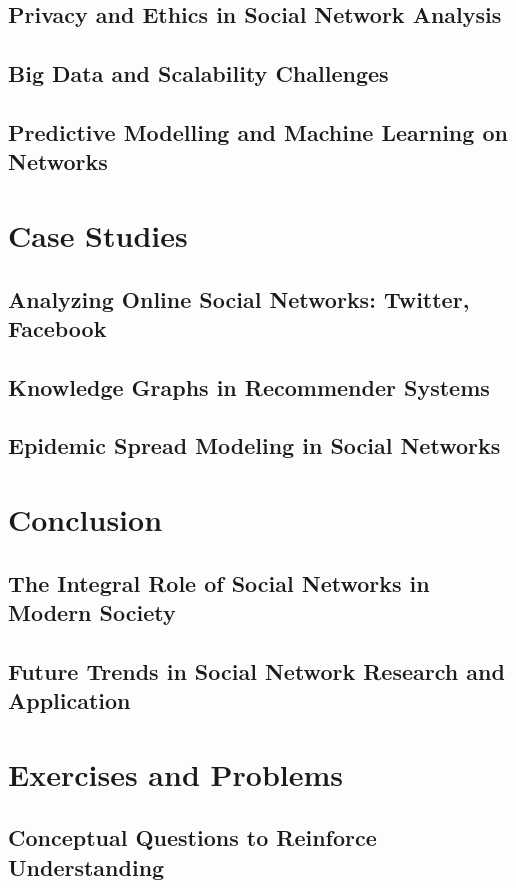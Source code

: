 \documentclass[12pt]{book} %
\begin{document}
\subsection{Privacy and Ethics in Social Network Analysis}
\subsection{Big Data and Scalability Challenges}
\subsection{Predictive Modelling and Machine Learning on Networks}

\section{Case Studies}
\subsection{Analyzing Online Social Networks: Twitter, Facebook}
\subsection{Knowledge Graphs in Recommender Systems}
\subsection{Epidemic Spread Modeling in Social Networks}

\section{Conclusion}
\subsection{The Integral Role of Social Networks in Modern Society}
\subsection{Future Trends in Social Network Research and Application}

\section{Exercises and Problems}
\subsection{Conceptual Questions to Reinforce Understanding}
\end{document}

